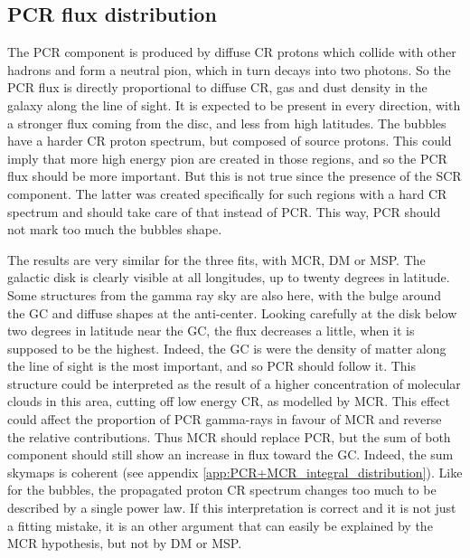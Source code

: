 \subsection{PCR flux distribution}
The PCR component is produced by diffuse CR protons which collide with other hadrons and form a neutral pion, which in turn decays into two photons. So the PCR flux is directly proportional to diffuse CR, gas and dust density in the galaxy along the line of sight. It is expected to be present in every direction, with a stronger flux coming from the disc, and less from high latitudes.
The bubbles have a harder CR proton spectrum, but composed of source protons. This could imply that more high energy pion are created in those regions, and so the PCR flux should be more important. But this is not true since the presence of the SCR component. The latter was created specifically for such regions with a hard CR spectrum and should take care of that instead of PCR. This way, PCR should not mark too much the bubbles shape.

The results are very similar for the three fits, with MCR, DM or MSP. The galactic disk is clearly visible at all longitudes, up to twenty degrees in latitude. Some structures from the gamma ray sky are also here, with the bulge around the GC and diffuse shapes at the anti-center.
Looking carefully at the disk below two degrees in latitude near the GC, the flux decreases a little, when it is supposed to be the highest. Indeed, the GC is were the density of matter along the line of sight is the most important, and so PCR should follow it. This structure could be interpreted as the result of a higher concentration of molecular clouds in this area, cutting off low energy CR, as modelled by MCR. This effect could affect the proportion of PCR gamma-rays in favour of MCR and reverse the relative contributions. Thus MCR should replace PCR, but the sum of both component should still show an increase in flux toward the GC. Indeed, the sum skymaps is coherent (see appendix \ref{app:PCR+MCR_integral_distribution}). Like for the bubbles, the propagated proton CR spectrum changes too much to be described by a single power law. If this interpretation is correct and it is not just a fitting mistake, it is an other argument that can easily be explained by the MCR hypothesis, but not by DM or MSP.


